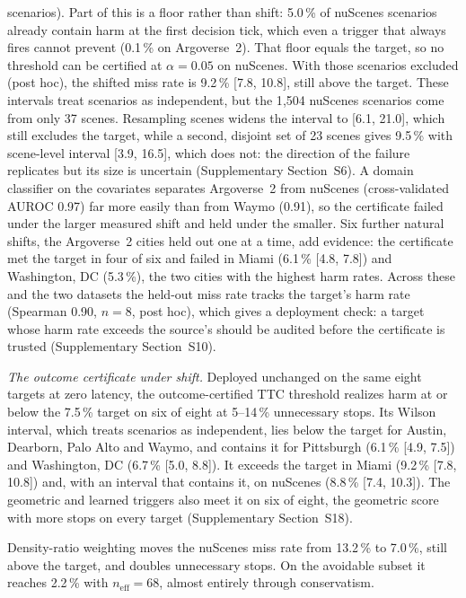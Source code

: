 \documentclass[lettersize,journal]{IEEEtran}
\begin{document}
scenarios). Part of this is a floor rather than shift: 5.0\,\% of
nuScenes scenarios already contain harm at the first decision tick, which
even a trigger that always fires cannot prevent (0.1\,\% on
Argoverse~2). That floor equals the target, so no threshold can be
certified at $\alpha = 0.05$ on nuScenes. With those scenarios excluded
(post hoc), the shifted miss rate is 9.2\,\% [7.8, 10.8], still above the
target. These intervals treat scenarios as independent, but the 1{,}504 nuScenes scenarios come from only 37 scenes. Resampling scenes widens the interval to [6.1, 21.0], which still excludes the target, while a second, disjoint set of 23 scenes gives 9.5\,\% with scene-level interval [3.9, 16.5], which does not: the direction of the failure replicates but its size is uncertain (Supplementary Section~S6). A domain classifier on the covariates separates Argoverse~2 from nuScenes (cross-validated AUROC 0.97) far more easily than from Waymo (0.91), so the certificate failed under the larger measured shift and held under the smaller. Six further natural shifts, the Argoverse~2 cities held out one at a time, add evidence: the certificate met the target in four of six and failed in Miami (6.1\,\% [4.8, 7.8]) and Washington, DC (5.3\,\%), the two cities with the highest harm rates. Across these and the two datasets the held-out miss rate tracks the target's harm rate (Spearman 0.90, $n=8$, post hoc), which gives a deployment check: a target whose harm rate exceeds the source's should be audited before the certificate is trusted (Supplementary Section~S10).

\emph{The outcome certificate under shift.} Deployed unchanged on the same eight targets at zero latency, the outcome-certified TTC threshold realizes harm at or below the 7.5\,\% target on six of eight at 5--14\,\% unnecessary stops. Its Wilson interval, which treats scenarios as independent, lies below the target for Austin, Dearborn, Palo Alto and Waymo, and contains it for Pittsburgh (6.1\,\% [4.9, 7.5]) and Washington, DC (6.7\,\% [5.0, 8.8]). It exceeds the target in Miami (9.2\,\% [7.8, 10.8]) and, with an interval that contains it, on nuScenes (8.8\,\% [7.4, 10.3]). The geometric and learned triggers also meet it on six of eight, the geometric score with more stops on every target (Supplementary Section~S18).

Density-ratio weighting moves the nuScenes miss rate from 13.2\,\% to 7.0\,\%, still above the target, and doubles unnecessary stops. On the avoidable subset it reaches 2.2\,\% with $n_{\mathrm{eff}}=68$, almost entirely through conservatism.
\end{document}
